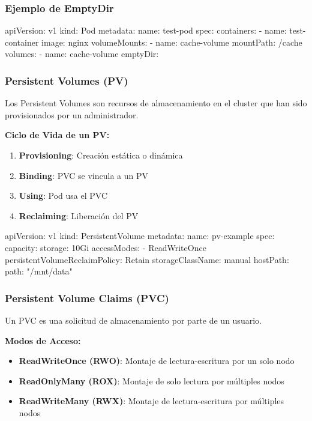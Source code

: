 \documentclass[11pt,a4paper]{article}
\begin{document}
\subsubsection{Ejemplo de EmptyDir}

\begin{commandbox}
apiVersion: v1
kind: Pod
metadata:
  name: test-pod
spec:
  containers:
  - name: test-container
    image: nginx
    volumeMounts:
    - name: cache-volume
      mountPath: /cache
  volumes:
  - name: cache-volume
    emptyDir: {}
\end{commandbox}

\subsubsection{Persistent Volumes (PV)}

Los Persistent Volumes son recursos de almacenamiento en el cluster que han sido provisionados por un administrador.

\textbf{Ciclo de Vida de un PV:}

\begin{enumerate}
    \item \textbf{\textcolor{k8sblue}{Provisioning}}: Creación estática o dinámica
    \item \textbf{\textcolor{k8ssuccess}{Binding}}: PVC se vincula a un PV
    \item \textbf{\textcolor{k8swarning}{Using}}: Pod usa el PVC
    \item \textbf{\textcolor{k8serror}{Reclaiming}}: Liberación del PV
\end{enumerate}

\begin{commandbox}
apiVersion: v1
kind: PersistentVolume
metadata:
  name: pv-example
spec:
  capacity:
    storage: 10Gi
  accessModes:
    - ReadWriteOnce
  persistentVolumeReclaimPolicy: Retain
  storageClassName: manual
  hostPath:
    path: "/mnt/data"
\end{commandbox}

\subsubsection{Persistent Volume Claims (PVC)}

Un PVC es una solicitud de almacenamiento por parte de un usuario.

\textbf{Modos de Acceso:}
\begin{itemize}
    \item \textbf{ReadWriteOnce (RWO)}: Montaje de lectura-escritura por un solo nodo
    \item \textbf{ReadOnlyMany (ROX)}: Montaje de solo lectura por múltiples nodos
    \item \textbf{ReadWriteMany (RWX)}: Montaje de lectura-escritura por múltiples nodos
\end{itemize}
\end{document}
